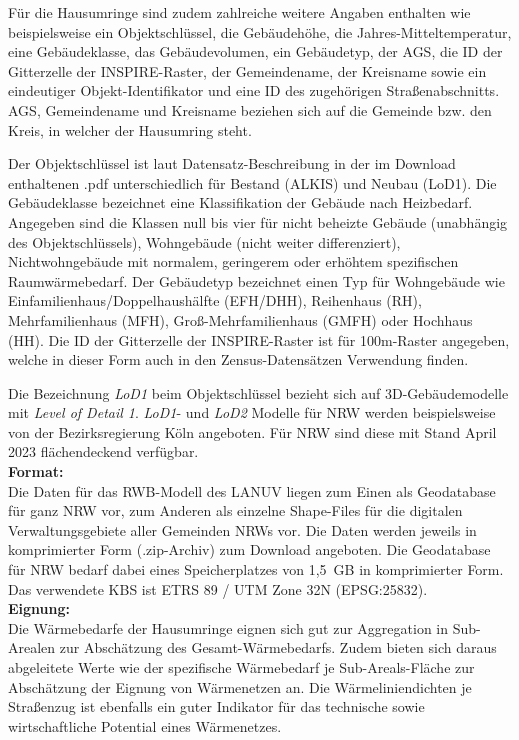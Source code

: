 			Für die Hausumringe sind zudem zahlreiche weitere Angaben enthalten wie beispielsweise ein Objektschlüssel, die Gebäudehöhe, die Jahres-Mitteltemperatur, eine Gebäudeklasse, das Gebäudevolumen, ein Gebäudetyp, der AGS, die ID der Gitterzelle der INSPIRE-Raster, der Gemeindename, der Kreisname sowie ein eindeutiger Objekt-Identifikator und eine ID des zugehörigen Straßenabschnitts. AGS, Gemeindename und Kreisname beziehen sich auf die Gemeinde bzw. den Kreis, in welcher der Hausumring steht.
			
			Der Objektschlüssel ist laut Datensatz-Beschreibung in der im Download enthaltenen .pdf unterschiedlich für Bestand (ALKIS) und Neubau (LoD1). Die Gebäudeklasse bezeichnet eine Klassifikation der Gebäude nach Heizbedarf. Angegeben sind die Klassen null bis vier für nicht beheizte Gebäude (unabhängig des Objektschlüssels), Wohngebäude (nicht weiter differenziert), Nichtwohngebäude mit normalem, geringerem oder erhöhtem spezifischen Raumwärmebedarf. Der Gebäudetyp bezeichnet einen Typ für Wohngebäude wie Einfamilienhaus/Doppelhaushälfte (EFH/DHH), Reihenhaus (RH), Mehrfamilienhaus (MFH), Groß-Mehrfamilienhaus (GMFH) oder Hochhaus (HH). Die ID der Gitterzelle der INSPIRE-Raster ist für 100m-Raster angegeben, welche in dieser Form auch in den Zensus-Datensätzen Verwendung finden.
			
			Die Bezeichnung \textit{LoD1} beim Objektschlüssel bezieht sich auf 3D-Gebäudemodelle mit \textit{Level of Detail 1}. \textit{LoD1}- und \textit{LoD2} Modelle für NRW werden beispielsweise von der Bezirksregierung Köln angeboten. Für NRW sind diese mit Stand April 2023 flächendeckend verfügbar. \cite{web_lod1_nrw} \\
			
			\textbf{Format:}\\
			Die Daten für das RWB-Modell des LANUV liegen zum Einen als Geodatabase für ganz NRW vor, zum Anderen als einzelne Shape-Files für die digitalen Verwaltungsgebiete aller Gemeinden NRWs vor. Die Daten werden jeweils in komprimierter Form (.zip-Archiv) zum Download angeboten. Die Geodatabase für NRW bedarf dabei eines Speicherplatzes von 1,5~GB in komprimierter Form. Das verwendete KBS ist ETRS 89 / UTM Zone 32N (EPSG:25832).\\
			
			\textbf{Eignung:}\\
			Die Wärmebedarfe der Hausumringe eignen sich gut zur Aggregation in Sub-Arealen zur Abschätzung des Gesamt-Wärmebedarfs. Zudem bieten sich daraus abgeleitete Werte wie der spezifische Wärmebedarf je Sub-Areals-Fläche zur Abschätzung der Eignung von Wärmenetzen an. Die Wärmeliniendichten je Straßenzug ist ebenfalls ein guter Indikator für das technische sowie wirtschaftliche Potential eines Wärmenetzes. 
				
